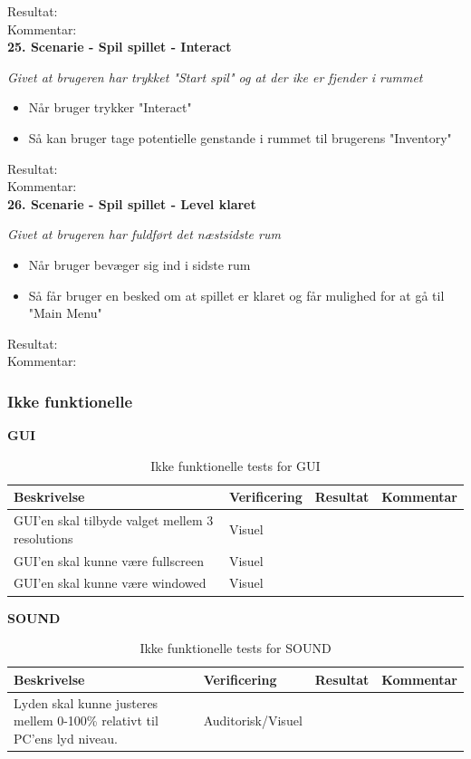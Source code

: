 Resultat:\\
Kommentar:\\

\textbf{25. Scenarie - Spil spillet - Interact}

\textit{Givet at brugeren har trykket "Start spil" og at der ike er fjender i rummet}

\begin{itemize}
  \item Når bruger trykker "Interact"
  \item Så kan bruger tage potentielle genstande i rummet til brugerens "Inventory"
\end{itemize}

Resultat:\\
Kommentar:\\

\textbf{26. Scenarie - Spil spillet - Level klaret}

\textit{Givet at brugeren har fuldført det næstsidste rum}

\begin{itemize}
  \item Når bruger bevæger sig ind i sidste rum
  \item Så får bruger en besked om at spillet er klaret og får mulighed for at gå til "Main Menu"
\end{itemize}

Resultat:\\
Kommentar:\\

\subsubsection{Ikke funktionelle}
\textbf{GUI}\\
\begin{table}[H]
\caption{ Ikke funktionelle tests for GUI}
\label{tab:}
\begin{tabular}{|p{3cm}|p{3cm}|p{3cm}|p{3cm}|}
\hline
Beskrivelse & Verificering & Resultat & Kommentar \\
\hline
GUI'en skal tilbyde valget mellem 3 resolutions & Visuel & & \\
\hline
GUI'en skal kunne være fullscreen & Visuel & &\\
\hline
GUI'en skal kunne være windowed & Visuel & & \\
\hline
\end{tabular}
\end{table}

\textbf{SOUND}\\
\begin{table}[H]
\caption{ Ikke funktionelle tests for SOUND}
\label{tab:}
\begin{tabular}{|p{3cm}|p{3cm}|p{3cm}|p{3cm}|	}
\hline
Beskrivelse & Verificering & Resultat & Kommentar \\
\hline
Lyden skal kunne justeres mellem 0-100\% relativt til PC'ens lyd niveau. & Auditorisk/Visuel & & \\
\hline
\end{tabular}
\end{table}

